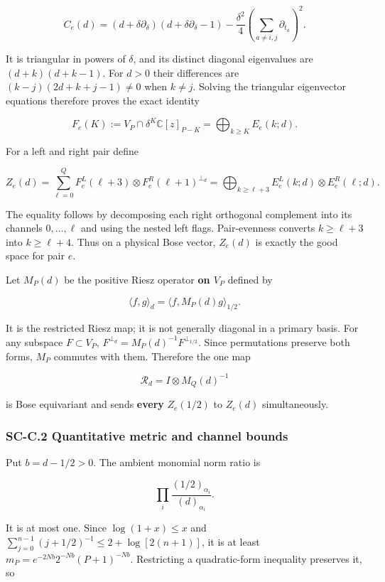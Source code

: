 \documentclass[a4paper,11pt]{article}
\numberwithin{equation}{section}
\begin{document}
\[
C_e(d)=(d+\delta\partial_\delta)(d+\delta\partial_\delta-1)
-\frac{\delta^2}{4}\left(\sum_{a\ne i,j}\partial_{t_a}\right)^2.
\]

It is triangular in powers of \(\delta\), and its distinct diagonal eigenvalues are \((d+k)(d+k-1)\). For \(d>0\) their differences are \((k-j)(2d+k+j-1)\ne0\) when \(k\ne j\). Solving the triangular eigenvector equations therefore proves the exact identity

\[
F_e(K):=V_P\cap\delta^K\mathbb C[z]_{P-K}
=\bigoplus_{k\geq K}E_e(k;d).
\]

For a left and right pair define

\[
Z_e(d)=\sum_{\ell=0}^{Q}
F_e^L(\ell+3)\otimes F_e^R(\ell+1)^{\perp_d}
=\bigoplus_{k\geq\ell+3}E_e^L(k;d)\otimes E_e^R(\ell;d).
\]

The equality follows by decomposing each right orthogonal complement into its channels \(0,\ldots,\ell\) and using the nested left flags. Pair-evenness converts \(k\geq\ell+3\) into \(k\geq\ell+4\). Thus on a physical Bose vector, \(Z_e(d)\) is exactly the good space for pair \(e\).

Let \(M_P(d)\) be the positive Riesz operator \textbf{on \(V_P\)} defined by

\[
\langle f,g\rangle_d=\langle f,M_P(d)g\rangle_{1/2}.
\]

It is the restricted Riesz map; it is not generally diagonal in a primary basis. For any subspace \(F\subset V_P\), \(F^{\perp_d}=M_P(d)^{-1}F^{\perp_{1/2}}\). Since permutations preserve both forms, \(M_P\) commutes with them. Therefore the one map

\[
\mathcal R_d=I\otimes M_Q(d)^{-1}
\]

is Bose equivariant and sends \textbf{every} \(Z_e(1/2)\) to \(Z_e(d)\) simultaneously.

\hypertarget{sc-c.2-quantitative-metric-and-channel-bounds}{%
\subsubsection{SC-C.2 Quantitative metric and channel bounds}\label{sc-c.2-quantitative-metric-and-channel-bounds}}

Put \(b=d-1/2>0\). The ambient monomial norm ratio is

\[
\prod_i\frac{(1/2)_{\alpha_i}}{(d)_{\alpha_i}}.
\]

It is at most one. Since \(\log(1+x)\leq x\) and \(\sum_{j=0}^{n-1}(j+1/2)^{-1}\leq2+\log[2(n+1)]\), it is at least \(m_P=e^{-2Nb}2^{-Nb}(P+1)^{-Nb}\). Restricting a quadratic-form inequality preserves it, so
\end{document}
